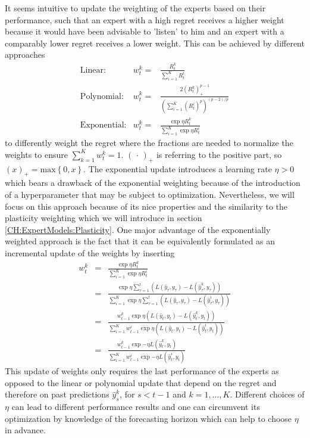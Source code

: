 It seems intuitive to update the weighting of the experts based on their performance, such that an expert with a high regret receives a higher weight because it would have been advisable to 'listen' to him and an expert with a comparably lower regret receives a lower weight. This can be achieved by different approaches \citep{CesaBianchi2006PredictionLearningGames}
\begin{eqnarray}
    \text{Linear:} & w_t^k = & \frac{R_t^k}{\sum_{i=1}^K R_t^{i}} \\
    \text{Polynomial:} & w_t^k = & \frac{2(R_t^k)_{+}^{p-1}}{\left(\sum_{i=1}^K (R_t^{i})^p\right)^{(p-2)/p}} \\
    \text{Exponential:} & w_t^k = & \frac{\exp{\eta R_t^k}}{\sum_{i=1}^{K} \exp{\eta R_t^i}}
\end{eqnarray}
to differently weight the regret where the fractions are needed to normalize the weights to ensure $\sum_{k=1}^{K} w_t^k = 1$. $( \, \cdot \,)_{+}$ is referring to the positive part, so $(x)_{+} = \text{max}\left\{0, x\right\}$. The exponential update introduces a learning rate $\eta > 0$ which bears a drawback of the exponential weighting because of the introduction of a hyperparameter that may be subject to optimization. Nevertheless, we will focus on this approach because of its nice properties and the similarity to the plasticity weighting which we will introduce in section \ref{CH:ExpertModels:Plasticity}. One major advantage of the exponentially weighted approach is the fact that it can be equivalently formulated as an incremental update of the weights by inserting 
\begin{eqnarray}
    w_t^k & = & \frac{\exp{\eta R_t^k}}{\sum_{i=1}^{K} \exp{\eta R_t^i}} \\
    & = & \frac{\exp{\eta \sum_{\tau=1}^{t} \left(L(\hat y_\tau, y_\tau)-L(\hat y_\tau^{k},y_\tau)\right)}}{\sum_{i=1}^{K} \exp{\eta \sum_{\tau=1}^{t} \left(L(\hat y_\tau, y_\tau)-L(\hat y_\tau^{i},y_\tau)\right)}} \\
    & = & \frac{w_{t-1}^k\exp{\eta \left(L(\hat y_t, y_t)-L(\hat y_t^{k},y_t)\right)}}{\sum_{i=1}^{K} w_{t-1}^i\exp{\eta \left(L(\hat y_t, y_t)-L(\hat y_t^{i},y_t)\right)}} \\
    & = & \frac{w_{t-1}^k\exp{-\eta L(\hat y_t^{k},y_t)}}{\sum_{i=1}^{K} w_{t-1}^i\exp{-\eta L(\hat y_t^{i},y_t)}} \label{EQ:LossUpdate} 
\end{eqnarray}
This update of weights only requires the last performance of the experts as opposed to the linear or polynomial update that depend on the regret and therefore on past predictions $\hat y_s^k$, for $s < t-1$ and $k = 1, ..., K$. Different choices of $\eta$ can lead to different performance results and one can circumvent its optimization by knowledge of the forecasting horizon which can help to choose $\eta$ in advance.


